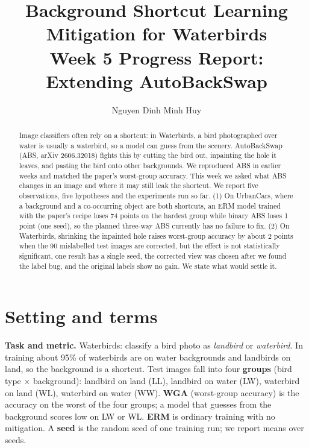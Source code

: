 \documentclass[runningheads]{llncs}
\begin{document}
\title{Background Shortcut Learning Mitigation for Waterbirds\texorpdfstring{\\}{: }
Week 5 Progress Report: Extending AutoBackSwap}
\author{Nguyen Dinh Minh Huy}
\maketitle
\raggedbottom

\begin{abstract}
Image classifiers often rely on a shortcut: in Waterbirds, a bird photographed over water is usually a waterbird, so a model can guess from the scenery. AutoBackSwap (ABS, arXiv 2606.32018) fights this by cutting the bird out, inpainting the hole it leaves, and pasting the bird onto other backgrounds. We reproduced ABS in earlier weeks and matched the paper's worst-group accuracy. This week we asked what ABS changes in an image and where it may still leak the shortcut. We report five observations, five hypotheses and the experiments run so far.
(1) On UrbanCars, where a background and a co-occurring object are both shortcuts, an ERM model trained with the paper's recipe loses 74 points on the hardest group while binary ABS loses 1 point (one seed), so the planned three-way ABS currently has no failure to fix.
(2) On Waterbirds, shrinking the inpainted hole raises worst-group accuracy by about 2 points when the 90 mislabelled test images are corrected, but the effect is not statistically significant, one result has a single seed, the corrected view was chosen after we found the label bug, and the original labels show no gain. We state what would settle it.
\end{abstract}

\section{Setting and terms}

\textbf{Task and metric.} Waterbirds: classify a bird photo as \emph{landbird} or \emph{waterbird}. In training about 95\% of waterbirds are on water backgrounds and landbirds on land, so the background is a shortcut. Test images fall into four \textbf{groups} (bird type $\times$ background): landbird on land (LL), landbird on water (LW), waterbird on land (WL), waterbird on water (WW). \textbf{WGA} (worst-group accuracy) is the accuracy on the worst of the four groups; a model that guesses from the background scores low on LW or WL. \textbf{ERM} is ordinary training with no mitigation. A \textbf{seed} is the random seed of one training run; we report means over seeds.
\end{document}
